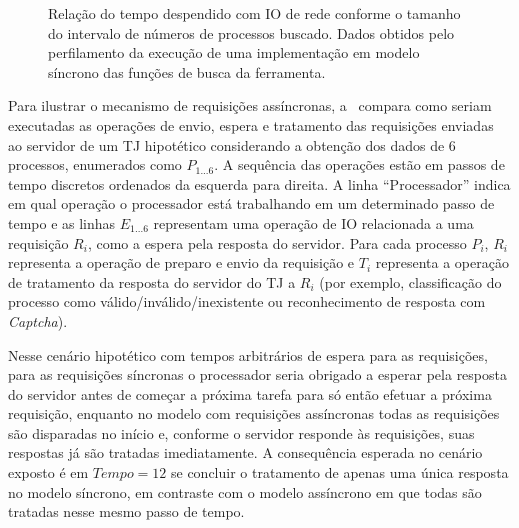 \begin{figure}[htb]
    \centering
    \caption{%
        Relação do tempo despendido com IO de rede conforme o tamanho do
        intervalo de números de processos buscado. Dados obtidos pelo
        perfilamento da execução de uma implementação em modelo síncrono das
        funções de busca da ferramenta.
    }
    \label{gra:tempo-io-por-num-processos}
\end{figure}

Para ilustrar o mecanismo de requisições assíncronas,
a~ compara como seriam executadas as
operações de envio, espera e tratamento das requisições enviadas ao servidor de
um TJ hipotético considerando a obtenção dos dados de 6 processos, enumerados
como $P_{1...6}$. A sequência das operações estão em passos de tempo discretos
ordenados da esquerda para direita. A linha ``Processador'' indica em qual
operação o processador está trabalhando em um determinado passo de tempo e as
linhas $E_{1...6}$ representam uma operação de IO relacionada a uma requisição
$R_i$, como a espera pela resposta do servidor.
%
Para cada processo $P_i$, $R_i$ representa a operação de preparo e envio da
requisição e $T_i$ representa a operação de tratamento da resposta do servidor
do TJ a $R_i$ (por exemplo, classificação do processo como
válido/inválido/inexistente ou reconhecimento de resposta com
\textit{Captcha}).


Nesse cenário hipotético com tempos arbitrários de espera para as requisições,
para as requisições síncronas o processador seria obrigado a esperar pela
resposta do servidor antes de começar a próxima tarefa para só então efetuar a
próxima requisição, enquanto no modelo com requisições assíncronas todas as
requisições são disparadas no início e, conforme o servidor responde às
requisições, suas respostas já são tratadas imediatamente. A consequência
esperada no cenário exposto é em $Tempo = 12$ se concluir o tratamento de
apenas uma única resposta no modelo síncrono, em contraste com o modelo
assíncrono em que todas são tratadas nesse mesmo passo de tempo.

